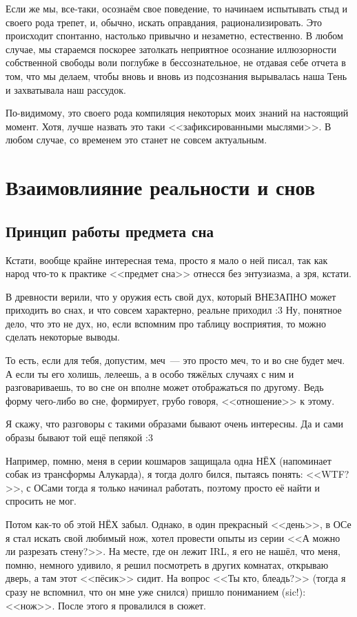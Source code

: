 \documentclass[a4paper,14pt,oneside]{memoir}
\begin{document}
Если же мы, все-таки, осознаём свое поведение, то начинаем испытывать стыд и своего рода трепет, и, обычно, искать оправдания, рационализировать. Это происходит спонтанно, настолько привычно и незаметно, естественно. В любом случае, мы стараемся поскорее затолкать неприятное осознание иллюзорности собственной свободы воли поглубже в бессознательное, не отдавая себе отчета в том, что мы делаем, чтобы вновь и вновь из подсознания вырывалась наша Тень и захватывала наш рассудок.

По-видимому, это своего рода компиляция некоторых моих знаний на настоящий момент. Хотя, лучше назвать это таки <<зафиксированными мыслями>>. В любом случае, со временем это станет не совсем актуальным.



\chapter{Взаимовлияние реальности и снов}



\section{Принцип работы предмета сна}
Кстати, вообще крайне интересная тема, просто я мало о ней писал, так как народ что-то к практике <<предмет сна>> отнесся без энтузиазма, а зря, кстати.

В древности верили, что у оружия есть свой дух, который ВНЕЗАПНО может приходить во снах, и что совсем характерно, реальне приходил :3 Ну, понятное дело, что это не дух, но, если вспомним про таблицу восприятия, то можно сделать некоторые выводы. 

То есть, если для тебя, допустим, меч~--- это просто меч, то и во сне будет меч. А если ты его холишь, лелеешь, а в особо тяжёлых случаях с ним и разговариваешь, то во сне он вполне может отображаться по другому. Ведь форму чего-либо во сне, формирует, грубо говоря, <<отношение>> к этому. 

Я скажу, что разговоры с такими образами бывают очень интересны. Да и сами образы бывают той ещё пепякой :3 

Например, помню, меня в серии кошмаров защищала одна НЁХ (напоминает собак из трансформы Алукарда), я тогда долго бился, пытаясь понять: <<WTF?>>, с ОСами тогда я только начинал работать, поэтому просто её найти и спросить не мог. 

Потом как-то об этой НЁХ забыл. Однако, в один прекрасный <<день>>, в ОСе я стал искать свой любимый нож, хотел провести опыты из серии <<А можно ли разрезать стену?>>. На месте, где он лежит IRL, я его не нашёл, что меня, помню, немного удивило, я решил посмотреть в других комнатах, открываю дверь, а там этот <<пёсик>> сидит. На вопрос <<Ты кто, блеадь?>> (тогда я сразу не вспомнил, что он мне уже снился) пришло пониманием (sic!): <<нож>>. После этого я провалился в сюжет.
\end{document}
